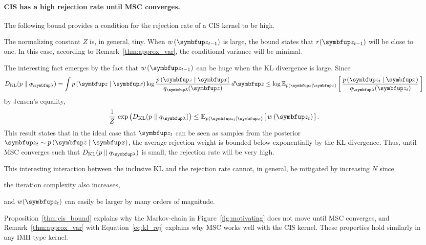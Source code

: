 \paragraph{CIS has a high rejection rate until MSC converges.}
The following bound provides a condition for the rejection rate of a CIS kernel to be high.
%

%
The normalizing constant \(Z\) is, in general, tiny.
When \(w\,(\vz_{t-1})\) is large, the bound states that \(r(\vz_{t-1})\) will be close to one.
In this case, according to Remark~\ref{thm:approx_var}, the conditional variance will be minimal.

The interesting fact emerges by the fact that \(w\,(\vz_{t-1})\) can be huge when the KL divergence is large.
Since
\begin{align}
  \DKL{p}{q_{\vlambda}} = \int p\,(\vz\mid\vx) \log \frac{p\,(\vz\mid\vx)}{q_{\vlambda}(\vz)} \, d\vz
  \leq \log \Esub{p(\vz\mid\vx)}{\frac{p\,(\vz_t\mid\vx)}{q_{\vlambda}(\vz_t)}}
\end{align}
by Jensen's equality, 
\begin{align}
  \frac{1}{Z}\,\exp\big(\DKL{p}{q_{\vlambda}}\big) \leq \Esub{p(\vz_t\mid\vx)}{w\,(\vz_{t})}.\label{eq:kl_rej}
\end{align}
This result states that in the ideal case that \(\vz_t\) can be seen as samples from the posterior \(\vz_t \sim p\,(\vz\mid\vx)\), the average rejection weight is bounded below exponentially by the KL divergence.
Thus, until MSC converges such that \(\DKL{p}{q_{\vlambda}}\) is small, the rejection rate will be very high.

This interesting interaction between the inclusive KL and the rejection rate cannot, in general, be mitigated by increasing \(N\) since
\begin{enumerate*}[label=(\roman*)]
  \item the iteration complexity also increases,
  \item and \(w(\vz_t)\) can easily be larger by many orders of magnitude.
\end{enumerate*}
Proposition~\ref{thm:cis_bound} explains why the Markov-chain in Figure~\ref{fig:motivating} does not move until MSC converges, and Remark~\ref{thm:approx_var} with Equation~\eqref{eq:kl_rej} explains why MSC works well with the CIS kernel.
These properties hold similarly in any IMH type kernel.

